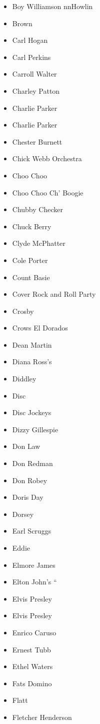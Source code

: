 \documentclass[12pt,a4paper]{article}
\begin{document}
\begin{itemize}
  \item Boy Williamson nnHowlin
  \item Brown
  \item Carl Hogan
  \item Carl Perkins
  \item Carroll Walter
  \item Charley Patton
  \item Charlie Parker
  \item Charlie Parker
  \item Chester Burnett
  \item Chick Webb Orchestra
  \item Choo Choo
  \item Choo Choo Ch' Boogie
  \item Chubby Checker
  \item Chuck Berry
  \item Clyde McPhatter
  \item Cole Porter
  \item Count Basie
  \item Cover Rock and Roll Party
  \item Crosby
  \item Crows El Dorados
  \item Dean Martin
  \item Diana Ross's
  \item Diddley
  \item Disc
  \item Disc Jockeys
  \item Dizzy Gillespie
  \item Don Law
  \item Don Redman
  \item Don Robey
  \item Doris Day
  \item Dorsey
  \item Earl Scruggs
  \item Eddie
  \item Elmore James
  \item Elton John's ``
  \item Elvis Presley
  \item Elvis Presley
  \item Enrico Caruso
  \item Ernest Tubb
  \item Ethel Waters
  \item Fats Domino
  \item Flatt
  \item Fletcher Henderson

\end{itemize}
\end{document}
